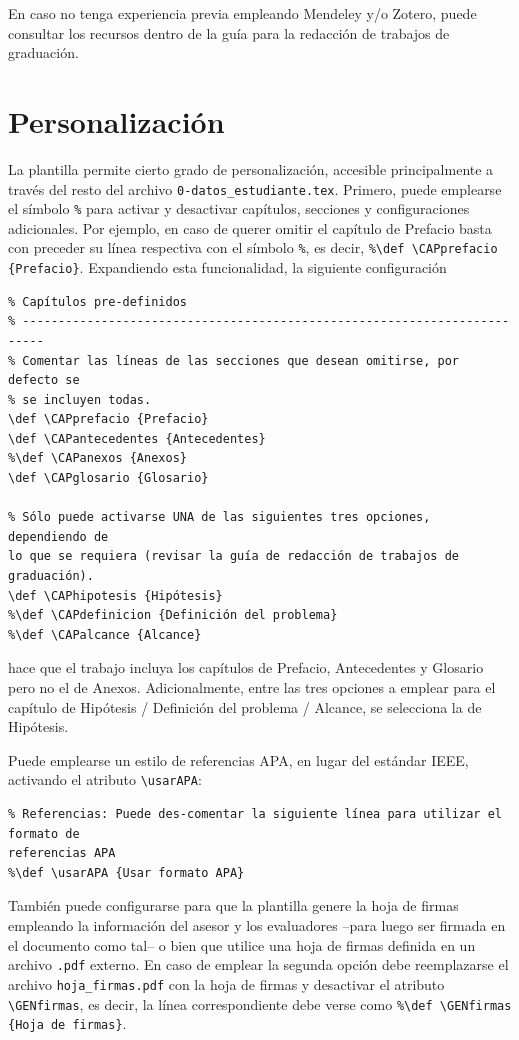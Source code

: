 En caso no tenga experiencia previa empleando Mendeley y/o Zotero, puede consultar los recursos dentro de la guía para la redacción de trabajos de graduación.

\section{Personalización}

La plantilla permite cierto grado de personalización, accesible principalmente a través del resto del archivo \verb|0-datos_estudiante.tex|. Primero, puede emplearse el símbolo \verb|%| para activar y desactivar capítulos, secciones y configuraciones adicionales. Por ejemplo, en caso de querer omitir el capítulo de Prefacio basta con preceder su línea respectiva con el símbolo \verb|%|, es decir, \verb|%\def \CAPprefacio {Prefacio}|. Expandiendo esta funcionalidad, la siguiente configuración

\begin{verbatim}
% Capítulos pre-definidos
% -------------------------------------------------------------------------
% Comentar las líneas de las secciones que desean omitirse, por defecto se 
% se incluyen todas.
\def \CAPprefacio {Prefacio}
\def \CAPantecedentes {Antecedentes}
%\def \CAPanexos {Anexos}
\def \CAPglosario {Glosario}

% Sólo puede activarse UNA de las siguientes tres opciones, dependiendo de 
lo que se requiera (revisar la guía de redacción de trabajos de graduación).
\def \CAPhipotesis {Hipótesis}
%\def \CAPdefinicion {Definición del problema}
%\def \CAPalcance {Alcance}
\end{verbatim}

hace que el trabajo incluya los capítulos de Prefacio, Antecedentes y Glosario pero no el de Anexos. Adicionalmente, entre las tres opciones a emplear para el capítulo de Hipótesis / Definición del problema / Alcance, se selecciona la de Hipótesis.

Puede emplearse un estilo de referencias APA, en lugar del estándar IEEE, activando el atributo \verb|\usarAPA|:
\begin{verbatim}
% Referencias: Puede des-comentar la siguiente línea para utilizar el formato de 
referencias APA
%\def \usarAPA {Usar formato APA}
\end{verbatim}

También puede configurarse para que la plantilla genere la hoja de firmas empleando la información del asesor y los evaluadores --para luego ser firmada en el documento como tal-- o bien que utilice una hoja de firmas definida en un archivo \texttt{.pdf} externo. En caso de emplear la segunda opción debe reemplazarse el archivo \verb|hoja_firmas.pdf| con la hoja de firmas y desactivar el atributo \verb|\GENfirmas|, es decir, la línea correspondiente debe verse como \verb|%\def \GENfirmas {Hoja de firmas}|.

